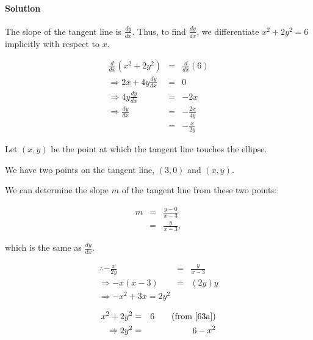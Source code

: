 

\paragraph{Solution} 

The slope of the tangent line is $\frac{dy}{dx}$. Thus, to find $\frac{dy}{dx}$, we differentiate $x^2+2y^2=6$ implicitly with respect to $x$.

\begin{eqnarray*}
	\frac{d}{dx}\left(x^2+2y^2\right)&=&\frac{d}{dx}\left(6\right)\\
	\Rightarrow 2x+4y\frac{dy}{dx}&=&0\\
	\Rightarrow 4y\frac{dy}{dx}&=&-2x\\
	\Rightarrow \frac{dy}{dx}&=&-\frac{2x}{4y}\\
	&=&-\frac{x}{2y}
\end{eqnarray*}

Let $\left(x,y\right)$ be the point at which the tangent line touches the ellipse.

We have two points on the tangent line, $\left(3,0\right)$ and $\left(x,y\right)$.

We can determine the slope $m$ of the tangent line from these two points:

\begin{eqnarray*}
	m&=&\frac{y-0}{x-3}\\
	&=&\frac{y}{x-3},
\end{eqnarray*}

which is the same as $\frac{dy}{dx}$.

\begin{eqnarray}
	\therefore-\frac{x}{2y}&=&\frac{y}{x-3}\nonumber\\
	\Rightarrow-x\left(x-3\right)&=&\left(2y\right)y\nonumber\\
	\Rightarrow-x^2+3x=2y^2\label{63b}
\end{eqnarray}

\begin{eqnarray}
	x^2+2y^2&=&6\qquad\mbox{(from \ref{63a})}\nonumber\\
	\Rightarrow2y^2&=&6-x^2\label{63c}
\end{eqnarray}

